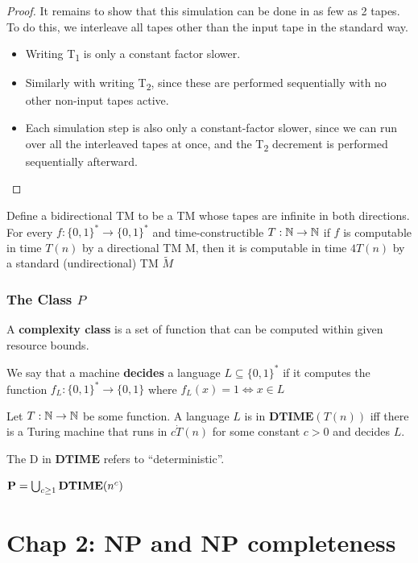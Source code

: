 \documentclass[11pt]{article}
\def \DTIME {\textbf{DTIME}}
\begin{document}
\begin{proof}
It remains to show that this simulation can be done in as few as 2 tapes. To do this, we interleave all tapes other than the input tape in the standard way.
\begin{itemize}
\item Writing T\textsubscript{1} is only a constant factor slower.
\item Similarly with writing T\textsubscript{2}, since these are performed sequentially with no other non-input tapes active.
\item Each simulation step is also only a constant-factor slower, since we can run over all the interleaved tapes at once, and the T\textsubscript{2} decrement is performed sequentially afterward.
\end{itemize}
\end{proof}

\begin{proposition}[]
Define a bidirectional TM to be a TM whose tapes are infinite in both directions. For
every \(f:\{0,1\}^*\to\{0,1\}^*\) and time-constructible \(T:\mathbb{N}\to\mathbb{N}\) if \(f\) is computable in
time \(T(n)\) by a directional TM M, then it is computable in time \(4T(n)\) by a standard
(undirectional) TM \(\tilde{M}\)
\end{proposition}

\subsubsection{The Class \texorpdfstring{\(P\)}{P}}
\label{sec:orga9db105}
A \textbf{complexity class} is a set of function that can be computed within given resource bounds.

We say that a machine \textbf{decides} a language \(L\subseteq\{0,1\}^*\) if it computes the
function \(f_L:\{0,1\}^*\to\{0,1\}\) where \(f_L(x)=1\Leftrightarrow x\in L\)

\begin{definition}[]
Let \(T:\mathbb{N}\to\mathbb{N}\) be some function. A language \(L\) is in \(\DTIME(T(n))\) iff there is a
Turing machine that runs in \(c\dot T(n)\) for some constant \(c>0\) and decides \(L\).
\end{definition}

The D in \(\DTIME\) refers to ``deterministic''.

\begin{definition}[]
\(\bP=\bigcup_{c\ge1}\DTIME(n^c)\)
\end{definition}

\section{Chap 2: NP and NP completeness}
\label{sec:org68f232f}
\end{document}
